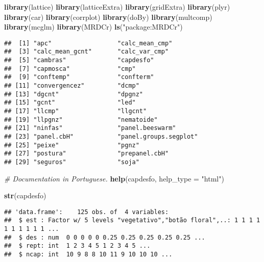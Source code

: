 \documentclass[9pt,a5paper,]{book}
\newenvironment{Shaded}{}{}
\newcommand{\KeywordTok}[1]{\textbf{{#1}}}
\newcommand{\DataTypeTok}[1]{\underline{{#1}}}
\newcommand{\StringTok}[1]{{#1}}
\newcommand{\CommentTok}[1]{\textit{{#1}}}
\newcommand{\NormalTok}[1]{{#1}}
\renewenvironment{Shaded}{\color{inputcolor}}{}
\renewcommand{\DataTypeTok}[1]{{#1}}
\theoremstyle{definition}
\theoremstyle{definition}
\theoremstyle{remark}
\begin{document}
\begin{Shaded}
\begin{Highlighting}[]
\KeywordTok{library}\NormalTok{(lattice)}
\KeywordTok{library}\NormalTok{(latticeExtra)}
\KeywordTok{library}\NormalTok{(gridExtra)}
\KeywordTok{library}\NormalTok{(plyr)}
\KeywordTok{library}\NormalTok{(car)}
\KeywordTok{library}\NormalTok{(corrplot)}
\KeywordTok{library}\NormalTok{(doBy)}
\KeywordTok{library}\NormalTok{(multcomp)}
\KeywordTok{library}\NormalTok{(mcglm)}
\KeywordTok{library}\NormalTok{(MRDCr)}
\KeywordTok{ls}\NormalTok{(}\StringTok{"package:MRDCr"}\NormalTok{)}
\end{Highlighting}
\end{Shaded}

\begin{verbatim}
##  [1] "apc"                  "calc_mean_cmp"       
##  [3] "calc_mean_gcnt"       "calc_var_cmp"        
##  [5] "cambras"              "capdesfo"            
##  [7] "capmosca"             "cmp"                 
##  [9] "conftemp"             "confterm"            
## [11] "convergencez"         "dcmp"                
## [13] "dgcnt"                "dpgnz"               
## [15] "gcnt"                 "led"                 
## [17] "llcmp"                "llgcnt"              
## [19] "llpgnz"               "nematoide"           
## [21] "ninfas"               "panel.beeswarm"      
## [23] "panel.cbH"            "panel.groups.segplot"
## [25] "peixe"                "pgnz"                
## [27] "postura"              "prepanel.cbH"        
## [29] "seguros"              "soja"
\end{verbatim}

\begin{Shaded}
\begin{Highlighting}[]
\CommentTok{# Documentation in Portuguese.}
\KeywordTok{help}\NormalTok{(capdesfo, }\DataTypeTok{help_type =} \StringTok{"html"}\NormalTok{)}
\end{Highlighting}
\end{Shaded}

\begin{Shaded}
\begin{Highlighting}[]
\KeywordTok{str}\NormalTok{(capdesfo)}
\end{Highlighting}
\end{Shaded}

\begin{verbatim}
## 'data.frame':    125 obs. of  4 variables:
##  $ est : Factor w/ 5 levels "vegetativo","botão floral",..: 1 1 1 1 1 1 1 1 1 1 ...
##  $ des : num  0 0 0 0 0 0.25 0.25 0.25 0.25 0.25 ...
##  $ rept: int  1 2 3 4 5 1 2 3 4 5 ...
##  $ ncap: int  10 9 8 8 10 11 9 10 10 10 ...
\end{verbatim}
\end{document}
